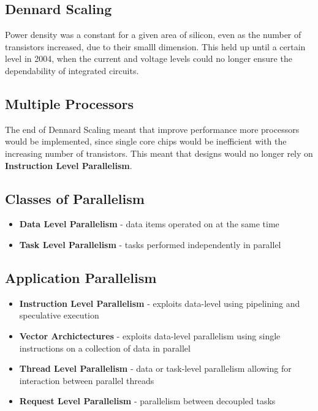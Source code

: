 \documentclass[11pt]{article}
\begin{document}
\subsection{Dennard Scaling}

Power density was a constant for a given area of silicon, even as the number of transistors increased, due to their smalll dimension. This held up until a certain level in 2004, when the current and voltage levels could no longer ensure the dependability of integrated circuits.

\subsection{Multiple Processors}

The end of Dennard Scaling meant that improve performance more processors would be implemented, since single core chips would be inefficient with the increasing number of transistors. This meant that designs would no longer rely on \textbf{Instruction Level Parallelism}.

\subsection{Classes of Parallelism}

\begin{itemize}
    \item \textbf{Data Level Parallelism} - data items operated on at the same time
    \item \textbf{Task Level Parallelism} - tasks performed independently in parallel
\end{itemize}

\subsection{Application Parallelism}

\begin{itemize}
    \item \textbf{Instruction Level Parallelism} - exploits data-level using pipelining and speculative execution
    \item \textbf{Vector Archictectures} - exploits data-level parallelism using single instructions on a collection of data in parallel
    \item \textbf{Thread Level Parallelism} - data or task-level parallelism allowing for interaction between parallel threads
    \item \textbf{Request Level Parallelism} - parallelism between decoupled tasks
\end{itemize}
\end{document}

